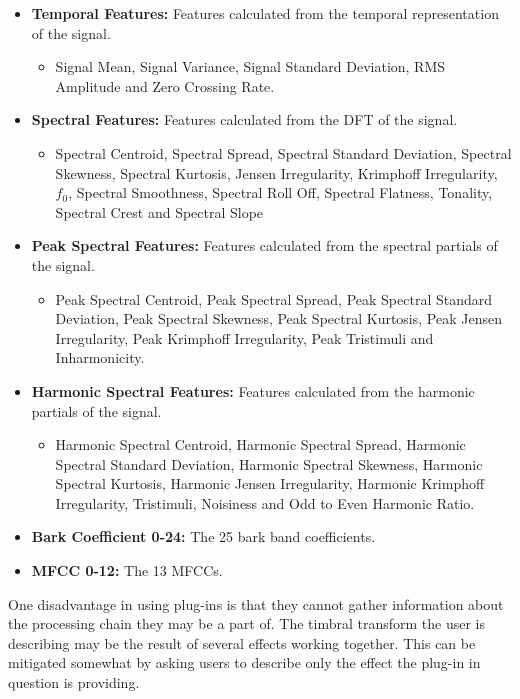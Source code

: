 		\begin{itemize}
			\item {\bf{Temporal Features:}} Features calculated from the temporal representation of the signal.
			\begin{itemize}
				\item Signal Mean, Signal Variance, Signal Standard Deviation, RMS Amplitude and Zero
					Crossing Rate.
			\end{itemize}
			\item {\bf{Spectral Features:}} Features calculated from the DFT of the signal.
			\begin{itemize}
				\item Spectral Centroid, Spectral Spread, Spectral Standard Deviation, Spectral Skewness,
				      Spectral Kurtosis, Jensen Irregularity, Krimphoff Irregularity, $f_{0}$, Spectral
				      Smoothness, Spectral Roll Off, Spectral Flatness, Tonality, Spectral Crest and
				      Spectral Slope
			\end{itemize}
			\item {\bf{Peak Spectral Features:}} Features calculated from the spectral partials of the signal.
			\begin{itemize}
				\item Peak Spectral Centroid, Peak Spectral Spread, Peak Spectral Standard Deviation, Peak
					Spectral Skewness, Peak Spectral Kurtosis, Peak Jensen Irregularity, Peak Krimphoff
					Irregularity, Peak Tristimuli and Inharmonicity.
			\end{itemize}
			\item {\bf{Harmonic Spectral Features:}} Features calculated from the harmonic partials of the
			      signal.
			\begin{itemize}
				\item Harmonic Spectral Centroid, Harmonic Spectral Spread, Harmonic Spectral Standard
					Deviation, Harmonic Spectral Skewness, Harmonic Spectral Kurtosis, Harmonic Jensen
					Irregularity, Harmonic Krimphoff Irregularity, Tristimuli, Noisiness and Odd to
					Even Harmonic Ratio.
			\end{itemize}
			\item {\bf{Bark Coefficient 0-24:}} The 25 bark band coefficients.
			\item {\bf{MFCC 0-12:}} The 13 MFCCs.
		\end{itemize}

		One disadvantage in using plug-ins is that they cannot gather information about the processing chain they
		may be a part of. The timbral transform the user is describing may be the result of several effects working
		together. This can be mitigated somewhat by asking users to describe only the effect the plug-in in
		question is providing.

